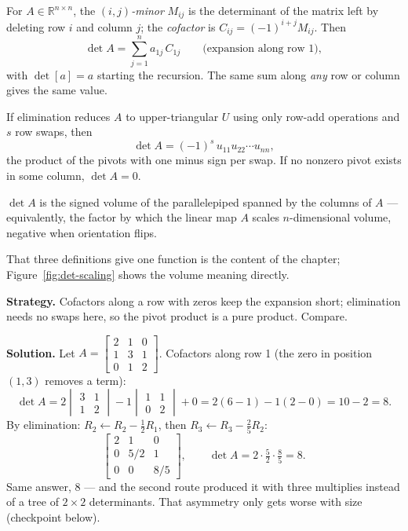 \begin{definition}
For $A\in\mathbb R^{n\times n}$, the \emph{$(i,j)$-minor} $M_{ij}$ is the
determinant of the matrix left by deleting row $i$ and column $j$; the
\emph{cofactor} is $C_{ij}=(-1)^{i+j}M_{ij}$. Then
\[
\det A=\sum_{j=1}^{n}a_{1j}\,C_{1j}
\qquad\text{(expansion along row 1)},
\]
with $\det[a]=a$ starting the recursion. The same sum along \emph{any} row
or column gives the same value.
\end{definition}

\begin{definition}
If elimination reduces $A$ to upper-triangular $U$ using only row-add
operations and $s$ row swaps, then
\[
\det A=(-1)^{s}\,u_{11}u_{22}\cdots u_{nn},
\]
the product of the pivots with one minus sign per swap. If no nonzero pivot
exists in some column, $\det A=0$.
\end{definition}

\begin{definition}
$\det A$ is the signed volume of the parallelepiped spanned by the columns
of $A$ --- equivalently, the factor by which the linear map $A$ scales
$n$-dimensional volume, negative when orientation flips.
\end{definition}

That three definitions give one function is the content of the chapter;
Figure~\ref{fig:det-scaling} shows the volume meaning directly.

\begin{example}\label{ex:det3}
\textbf{Strategy.} Cofactors along a row with zeros keep the expansion
short; elimination needs no swaps here, so the pivot product is a pure
product. Compare.

\textbf{Solution.} Let
$A=\begin{bmatrix}2&1&0\\1&3&1\\0&1&2\end{bmatrix}$.
Cofactors along row 1 (the zero in position $(1,3)$ removes a term):
\[
\det A
=2\begin{vmatrix}3&1\\1&2\end{vmatrix}
-1\begin{vmatrix}1&1\\0&2\end{vmatrix}
+0
=2(6-1)-1(2-0)=10-2=8 .
\]
By elimination: $R_2\leftarrow R_2-\tfrac12R_1$, then
$R_3\leftarrow R_3-\tfrac{2}{5}R_2$:
\[
\begin{bmatrix}2&1&0\\0&5/2&1\\0&0&8/5\end{bmatrix},
\qquad \det A=2\cdot\tfrac52\cdot\tfrac85=8 .
\]
Same answer, $8$ --- and the second route produced it with three
multiplies instead of a tree of $2\times2$ determinants. That asymmetry
only gets worse with size (checkpoint below).
\end{example}

